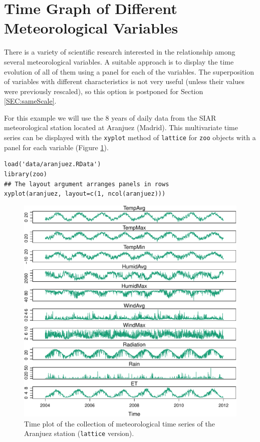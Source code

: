 
\section{Time Graph of Different Meteorological Variables}
\label{sec-1}
\label{sec:differentVariables}
There is a variety of scientific research interested in the
relationship among several meteorological variables. A suitable
approach is to display the time evolution of all of them using a
panel for each of the variables. The superposition of variables
with different characteristics is not very useful (unless their
values were previously rescaled), so this option is postponed for
Section \ref{SEC:sameScale}.

For this example we will use the 8 years of daily data from the
SIAR meteorological station located at Aranjuez (Madrid).  This
multivariate time series can be displayed with the \texttt{xyplot} method of
\texttt{lattice} for \texttt{zoo} objects with a panel for each variable (Figure
\ref{fig:aranjuezNaive}).

\lstset{language=R,numbers=none}
\begin{lstlisting}
load('data/aranjuez.RData')
library(zoo)
## The layout argument arranges panels in rows
xyplot(aranjuez, layout=c(1, ncol(aranjuez)))
\end{lstlisting}

\begin{figure}[htb]
\centering
\includegraphics[width=.9\linewidth]{figs/aranjuez.pdf}
\caption{\label{fig:aranjuezNaive}Time plot of the collection of meteorological time series of the Aranjuez station (\texttt{lattice} version).}
\end{figure}

